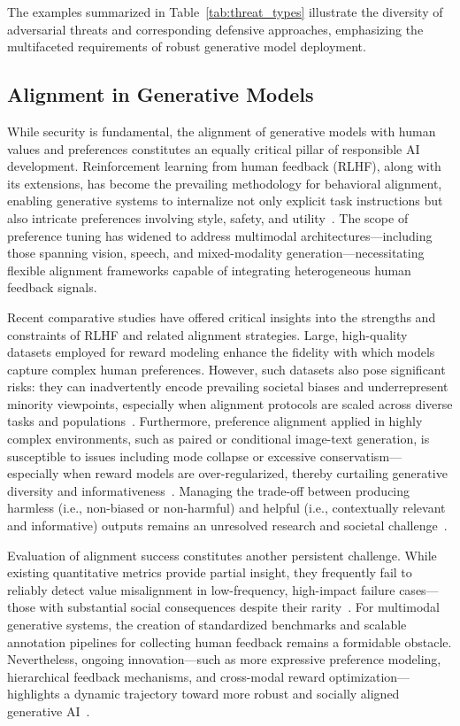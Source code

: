 The examples summarized in Table~\ref{tab:threat_types} illustrate the diversity of adversarial threats and corresponding defensive approaches, emphasizing the multifaceted requirements of robust generative model deployment.

\subsection{Alignment in Generative Models}

While security is fundamental, the alignment of generative models with human values and preferences constitutes an equally critical pillar of responsible AI development. Reinforcement learning from human feedback (RLHF), along with its extensions, has become the prevailing methodology for behavioral alignment, enabling generative systems to internalize not only explicit task instructions but also intricate preferences involving style, safety, and utility~\cite{ref69,ref75}. The scope of preference tuning has widened to address multimodal architectures—including those spanning vision, speech, and mixed-modality generation—necessitating flexible alignment frameworks capable of integrating heterogeneous human feedback signals.

Recent comparative studies have offered critical insights into the strengths and constraints of RLHF and related alignment strategies. Large, high-quality datasets employed for reward modeling enhance the fidelity with which models capture complex human preferences. However, such datasets also pose significant risks: they can inadvertently encode prevailing societal biases and underrepresent minority viewpoints, especially when alignment protocols are scaled across diverse tasks and populations~\cite{ref69}. Furthermore, preference alignment applied in highly complex environments, such as paired or conditional image-text generation, is susceptible to issues including mode collapse or excessive conservatism—especially when reward models are over-regularized, thereby curtailing generative diversity and informativeness~\cite{ref75}. Managing the trade-off between producing harmless (i.e., non-biased or non-harmful) and helpful (i.e., contextually relevant and informative) outputs remains an unresolved research and societal challenge~\cite{ref75}.

Evaluation of alignment success constitutes another persistent challenge. While existing quantitative metrics provide partial insight, they frequently fail to reliably detect value misalignment in low-frequency, high-impact failure cases—those with substantial social consequences despite their rarity~\cite{ref75}. For multimodal generative systems, the creation of standardized benchmarks and scalable annotation pipelines for collecting human feedback remains a formidable obstacle. Nevertheless, ongoing innovation—such as more expressive preference modeling, hierarchical feedback mechanisms, and cross-modal reward optimization—highlights a dynamic trajectory toward more robust and socially aligned generative AI~\cite{ref69,ref75}.

